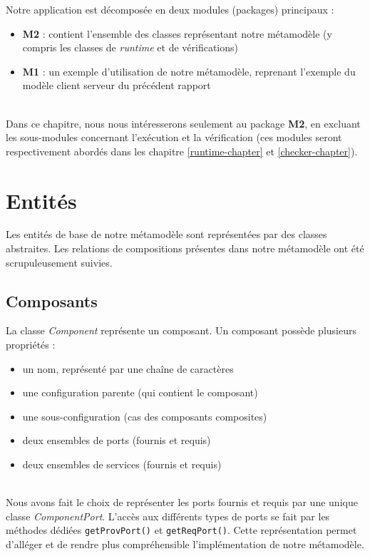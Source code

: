       Notre application est décomposée en deux modules (packages) principaux :
      \begin{itemize}
      \item \textbf{M2} : contient l'ensemble des classes représentant notre métamodèle (y compris les classes de \emph{runtime} et de vérifications)
      \item \textbf{M1} : un exemple d'utilisation de notre métamodèle, reprenant l'exemple du modèle client serveur du précédent rapport
      \end{itemize}
      ~\\
      Dans ce chapitre, nous nous intéresserons seulement au package  \textbf{M2}, en excluant les sous-modules concernant l'exécution et la vérification (ces modules seront respectivement abordés dans les chapitre \ref{runtime-chapter} et \ref{checker-chapter}).
      
	\section{Entités}
    	Les entités de base de notre métamodèle sont représentées par des classes abstraites. Les relations de compositions présentes dans notre métamodèle ont été scrupuleusement suivies.
        
        \subsection{Composants}
        	La classe \emph{Component} représente un composant. Un composant possède plusieurs propriétés :
            \begin{itemize}
            	\item un nom, représenté par une chaîne de caractères
                \item une configuration parente (qui contient le composant)
                \item une sous-configuration (cas des composants composites)
                \item deux ensembles de ports (fournis et requis)
                \item deux ensembles de services (fournis et requis)
            \end{itemize}
            ~\\
            
            Nous avons fait le choix de représenter les ports fournis et requis par une unique classe \emph{ComponentPort}. L'accès aux différents types de ports se fait par les méthodes dédiées \lstinline{getProvPort()} et \lstinline{getReqPort()}. Cette représentation permet d'alléger et de rendre plus compréhensible l'implémentation de notre métamodèle.
            \newline
            
